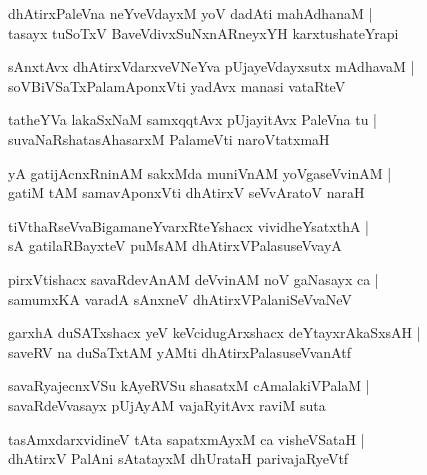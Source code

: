 \documentclass[twoside,12pt,openright]{book}
\newcounter{shloka}[chapter]
\begin{document}
\begin{shloka}%
dhAtirxPaleVna neYveVdayxM yoV dadAti mahAdhanaM |\\
tasayx tuSoTxV BaveVdivxSuNxnARneyxYH karxtushateYrapi
\end{shloka}

\begin{shloka}%
sAnxtAvx dhAtirxVdarxveVNeYva pUjayeVdayxsutx mAdhavaM |\\
soVBiVSaTxPalamAponxVti yadAvx manasi vataRteV 
\end{shloka}

\begin{shloka}%
tatheYVa lakaSxNaM samxqqtAvx pUjayitAvx PaleVna tu |\\
suvaNaRshatasAhasarxM PalameVti naroVtatxmaH 
\end{shloka}

\begin{shloka}%
yA gatijAcnxRninAM sakxMda muniVnAM yoVgaseVvinAM |\\
gatiM tAM samavAponxVti dhAtirxV seVvAratoV naraH
\end{shloka}

\begin{shloka}%
tiVthaRseVvaBigamaneYvarxRteYshacx vividheYsatxthA |\\
sA gatilaRBayxteV puMsAM dhAtirxVPalasuseVvayA 
\end{shloka}

\begin{shloka}%
pirxVtishacx savaRdevAnAM deVvinAM noV gaNasayx ca |\\
samumxKA varadA sAnxneV dhAtirxVPalaniSeVvaNeV
\end{shloka}

\begin{shloka}%
garxhA duSATxshacx yeV keVcidugArxshacx deYtayxrAkaSxsAH |\\
saveRV na duSaTxtAM yAMti dhAtirxPalasuseVvanAtf 
\end{shloka}

\begin{shloka}%
savaRyajecnxVSu kAyeRVSu shasatxM cAmalakiVPalaM |\\
savaRdeVvasayx pUjAyAM vajaRyitAvx raviM suta
\end{shloka}

\begin{shloka}%
tasAmxdarxvidineV tAta sapatxmAyxM ca visheVSataH |\\
dhAtirxV PalAni sAtatayxM dhUrataH parivajaRyeVtf 
\end{shloka}
\end{document}
